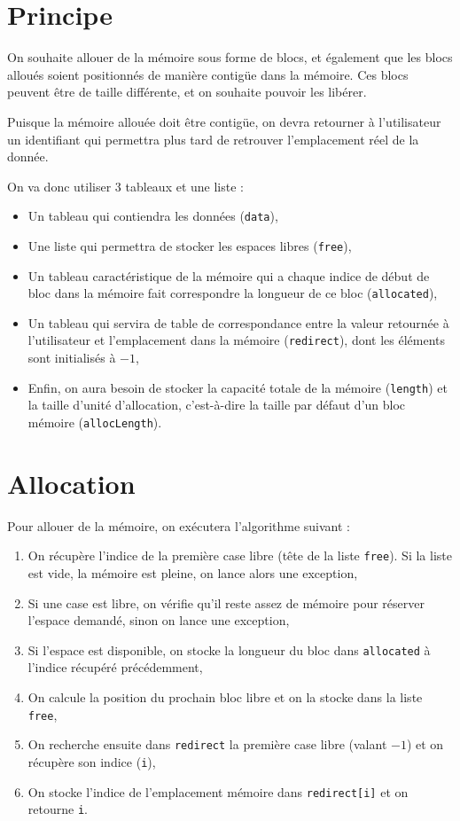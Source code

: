 \documentclass{report}
\newcommand{\code}{\lstinline[style=customjava]}
\begin{document}
    \section{Principe}
      On souhaite allouer de la mémoire sous forme de blocs, et également que les blocs alloués soient positionnés de manière contigüe dans la mémoire. Ces blocs peuvent être de taille différente, et on souhaite pouvoir les libérer.
      
      Puisque la mémoire allouée doit être contigüe, on devra retourner à l'utilisateur un identifiant qui permettra plus tard de retrouver l'emplacement réel de la donnée.
      
      On va donc utiliser 3 tableaux et une liste :
      \begin{itemize}
	\item Un tableau qui contiendra les données (\code{data}),
	\item Une liste qui permettra de stocker les espaces libres (\code{free}),
	\item Un tableau caractéristique de la mémoire qui a chaque indice de début de bloc dans la mémoire fait correspondre la longueur de ce bloc (\code{allocated}),
	\item Un tableau qui servira de table de correspondance entre la valeur retournée à l'utilisateur et l'emplacement dans la mémoire (\code{redirect}), dont les éléments sont initialisés à $-1$,
	\item Enfin, on aura besoin de stocker la capacité totale de la mémoire (\code{length}) et la taille d'unité d'allocation, c'est-à-dire la taille par défaut d'un bloc mémoire (\code{allocLength}).
      \end{itemize}
    \section{Allocation}
      Pour allouer de la mémoire, on exécutera l'algorithme suivant :
      \begin{enumerate}
	\item On récupère l'indice de la première case libre (tête de la liste \code{free}). Si la liste est vide, la mémoire est pleine, on lance alors une exception,
	\item Si une case est libre, on vérifie qu'il reste assez de mémoire pour réserver l'espace demandé, sinon on lance une exception,
	\item Si l'espace est disponible, on stocke la longueur du bloc dans \code{allocated} à l'indice récupéré précédemment,
	\item On calcule la position du prochain bloc libre et on la stocke dans la liste \code{free},
	\item On recherche ensuite dans \code{redirect} la première case libre (valant $-1$) et on récupère son indice (\code{i}),
	\item On stocke l'indice de l'emplacement mémoire dans \code{redirect[i]} et on retourne \code{i}.
      \end{enumerate}
    \newpage
\end{document}
